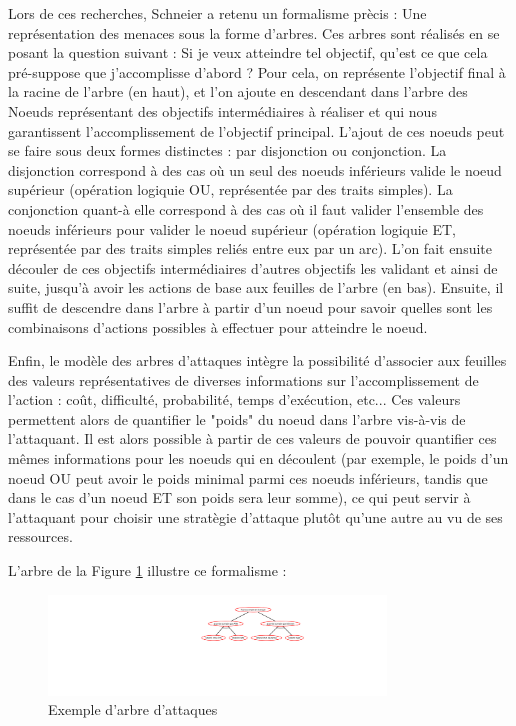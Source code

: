 		Lors de ces recherches, Schneier a retenu un formalisme prècis : Une représentation des menaces sous la forme d'arbres. Ces arbres sont réalisés en se posant la question suivant : Si je veux atteindre tel objectif, qu'est ce que cela pré-suppose que j'accomplisse d'abord ? Pour cela, on représente l'objectif final à la racine de l'arbre (en haut), et l'on ajoute en descendant dans l'arbre des Noeuds représentant des objectifs intermédiaires à réaliser et qui nous garantissent l'accomplissement de l'objectif principal. L'ajout de ces noeuds peut se faire sous deux formes distinctes : par disjonction ou conjonction. La disjonction correspond à des cas où un seul des noeuds inférieurs valide le noeud supérieur (opération logiquie OU, représentée par des traits simples). La conjonction quant-à elle correspond à des cas où il faut valider l'ensemble des noeuds inférieurs pour valider le noeud supérieur (opération logiquie ET, représentée par des traits simples reliés entre eux par un arc). L'on fait ensuite découler de ces objectifs intermédiaires d'autres objectifs les validant et ainsi de suite, jusqu'à avoir les actions de base aux feuilles de l'arbre (en bas). Ensuite, il suffit de descendre dans l'arbre à partir d'un noeud pour savoir quelles sont les combinaisons d'actions possibles à effectuer pour atteindre le noeud. 

		Enfin, le modèle des arbres d'attaques intègre la possibilité d'associer aux feuilles des valeurs représentatives de diverses informations sur l'accomplissement de l'action : coût, difficulté, probabilité, temps d'exécution, etc... Ces valeurs permettent alors de quantifier le "poids" du noeud dans l'arbre vis-à-vis de l'attaquant.  Il est alors possible à partir de ces valeurs de pouvoir quantifier ces mêmes informations pour les noeuds qui en découlent (par exemple, le poids d'un noeud OU peut avoir le poids minimal parmi ces noeuds inférieurs, tandis que dans le cas d'un noeud ET son poids sera leur somme), ce qui peut servir à l'attaquant pour choisir une stratègie d'attaque plutôt qu'une autre au vu de ses ressources.

		L'arbre de la Figure \ref{fig:arbre_exemple_1} illustre ce formalisme : 

		\begin{figure}
			\begin{center}
				\includegraphics[width=0.8\textwidth]{figure/exemple1_rapport.png}
			\end{center}
			\caption{Exemple d'arbre d'attaques}
			\label{fig:arbre_exemple_1}
		\end{figure}

